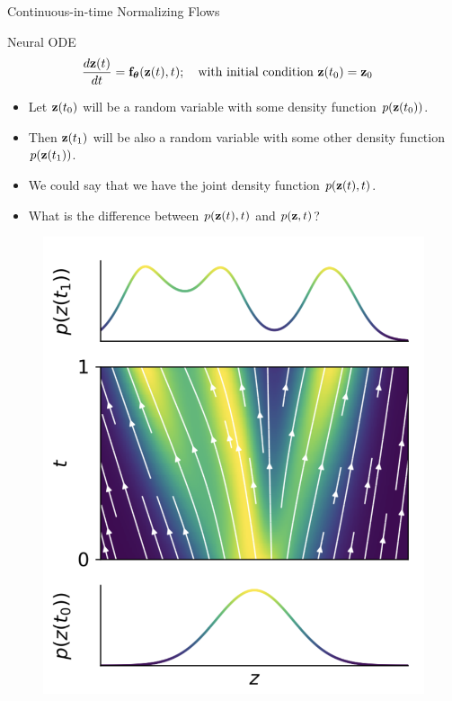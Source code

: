\begin{frame}{Continuous-in-time Normalizing Flows}
	\vspace{-0.5cm}
	\begin{block}{Neural ODE}
		\vspace{-0.5cm}
		\begin{align*}
  \frac{d \mathbf{z}(t)}{dt} &= \mathbf{f}_{\boldsymbol{\theta}}(\mathbf{z}(t), t); \quad \text{with initial condition }\mathbf{z}(t_0) = \mathbf{z}_0
		\end{align*}
		\vspace{-0.8cm}
	\end{block}
	\begin{minipage}[t]{0.6\columnwidth}
		\begin{itemize}
			\item Let $\mathbf{z}(t_0)$ will be a random variable with some density function $p(\mathbf{z}(t_0))$.
		 	\item Then $\mathbf{z}(t_1)$ will be also a random variable with some other density function $p(\mathbf{z}(t_1))$.
			\item We could say that we have the joint density function $p(\mathbf{z}(t), t)$.
			\item What is the difference between $p(\mathbf{z}(t), t)$ and $p(\mathbf{z}, t)$?
		\end{itemize}
	\end{minipage}%
	\begin{minipage}[t]{0.4\columnwidth}	
		\begin{figure}
			\centering
			\includegraphics[width=\linewidth]{figs/cnf_flow.png}
		\end{figure}
	\end{minipage}
\end{frame}
